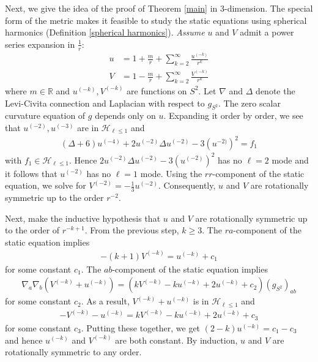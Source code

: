 \documentclass[12pt,twoside]{article}
\theoremstyle{plain}
\theoremstyle{definition}
\theoremstyle{remark}
\newcommand{\na}{\nabla}
\newcommand{\lt}{\left}
\newcommand{\rt}{\right}
\newcommand{\R}{\mathbb{R}}
\numberwithin{equation}{section}
\begin{document}
Next, we give the idea of the proof of Theorem \ref{main} in 3-dimension. The special form of the metric makes it feasible to study the static equations using spherical harmonics (Definition \ref{spherical harmonics}). {\it Assume} $u$ and $V$ admit a power series expansion in $\frac{1}{r}$:
\begin{align*}
u &= 1 + \frac{m}{r} + \sum_{k=2}^\infty \frac{u^{(-k)}}{r^k}\\
V &= 1 - \frac{m}{r} + \sum_{k=2}^\infty \frac{V^{(-k)}}{r^{k}}
\end{align*}
where $m \in \R$ and $u^{(-k)}, V^{(-k)}$ are functions on $S^2$. Let $\na$ and $\Delta$ denote the Levi-Civita connection and Laplacian with respect to $g_{S^2}$. The zero scalar curvature equation of $g$ depends only on $u$. Expanding it order by order, we see that $u^{(-2)}, u^{(-3)}$ are in $\mathcal{H}_{\ell\le 1}$ and 
\begin{align*}
(\Delta + 6) u^{(-4)} + 2 u^{(-2)}\Delta u^{(-2)} -3 (u^{-2)})^2 = f_1
\end{align*}
with $f_1 \in \mathcal{H}_{\ell\le 1}$. Hence $2u^{(-2)}\Delta u^{(-2)} - 3 (u^{(-2)})^2$ has no $\ell=2$ mode and it follows that $u^{(-2)}$ has no $\ell=1$ mode. Using the $rr$-component of the static equation, we solve for $V^{(-2)} = -\frac{1}{3} u^{(-2)}$. Consequently, $u$ and $V$ are rotationally symmetric up to the order $r^{-2}$.

Next, make the inductive hypothesis that $u$ and $V$ are rotationally symmetric up to the order of $r^{-k+1}$. From the previous step, $k \ge 3$. The $ra$-component of the static equation implies
\begin{align*}
-(k+1) V^{(-k)} =  u^{(-k)} + c_1
\end{align*}
for some constant $c_1$. The $ab$-component of the static equation implies
\begin{align*}
\na_a\na_b (V^{(-k)} + u^{(-k)}) = \lt( k V^{(-k)} - k u^{(-k)} + 2 u^{(-k)} + c_2 \rt) (g_{S^2})_{ab}
\end{align*}
for some constant $c_2$. As a result, $V^{(-k)} + u^{(-k)}$ is in $\mathcal{H}_{\ell\le 1}$ and
\begin{align*}
-V^{(-k)} - u^{(-k)} = k V^{(-k)} - k u^{(-k)} + 2 u^{(-k)} + c_3 
\end{align*}
for some constant $c_3$. Putting these together, we get $(2-k) u^{(-k)} = c_1 - c_3$ and hence $u^{(-k)}$ and $V^{(-k)}$ are both constant. By induction, $u$ and $V$ are rotationally symmetric to any order.
\end{document}
